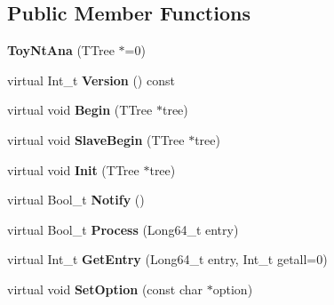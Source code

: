 \subsection*{Public Member Functions}
\begin{DoxyCompactItemize}
\item 
\hypertarget{classToyNtAna_a900d4cb959f708a25ac0df7645622752}{
{\bfseries ToyNtAna} (TTree $\ast$=0)}
\label{classToyNtAna_a900d4cb959f708a25ac0df7645622752}

\item 
\hypertarget{classToyNtAna_a955fddd314d08528d402066ee3c3612a}{
virtual Int\_\-t {\bfseries Version} () const }
\label{classToyNtAna_a955fddd314d08528d402066ee3c3612a}

\item 
\hypertarget{classToyNtAna_abbbc16db7a544ca3c1ec1ecb41e1338f}{
virtual void {\bfseries Begin} (TTree $\ast$tree)}
\label{classToyNtAna_abbbc16db7a544ca3c1ec1ecb41e1338f}

\item 
\hypertarget{classToyNtAna_a430c50c1422314d5844debf21944275d}{
virtual void {\bfseries SlaveBegin} (TTree $\ast$tree)}
\label{classToyNtAna_a430c50c1422314d5844debf21944275d}

\item 
\hypertarget{classToyNtAna_a66fa022e163ff5d31aa2451d2d6bb7b5}{
virtual void {\bfseries Init} (TTree $\ast$tree)}
\label{classToyNtAna_a66fa022e163ff5d31aa2451d2d6bb7b5}

\item 
\hypertarget{classToyNtAna_adaf14a41badd46a1ea5390ca0c244a5b}{
virtual Bool\_\-t {\bfseries Notify} ()}
\label{classToyNtAna_adaf14a41badd46a1ea5390ca0c244a5b}

\item 
\hypertarget{classToyNtAna_af717806ba276e0af9c198fdb4b50ad03}{
virtual Bool\_\-t {\bfseries Process} (Long64\_\-t entry)}
\label{classToyNtAna_af717806ba276e0af9c198fdb4b50ad03}

\item 
\hypertarget{classToyNtAna_ad6621e2f59a97b4dc9eeb84399a0cde1}{
virtual Int\_\-t {\bfseries GetEntry} (Long64\_\-t entry, Int\_\-t getall=0)}
\label{classToyNtAna_ad6621e2f59a97b4dc9eeb84399a0cde1}

\item 
\hypertarget{classToyNtAna_ac38fbeb31a4d10924d0204676c6c9108}{
virtual void {\bfseries SetOption} (const char $\ast$option)}
\label{classToyNtAna_ac38fbeb31a4d10924d0204676c6c9108}


\end{DoxyCompactItemize}

